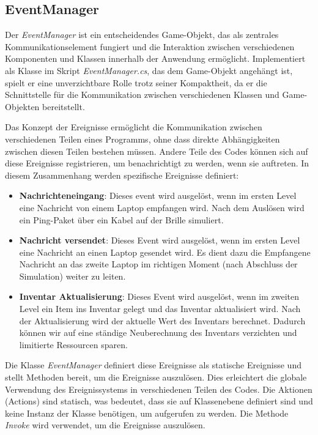 \subsection{EventManager} 

Der \textit{EventManager} ist ein entscheidendes Game-Objekt, das als zentrales Kommunikationselement fungiert und die
Interaktion zwischen verschiedenen Komponenten und Klassen innerhalb der Anwendung ermöglicht. Implementiert als Klasse
im Skript \textit{EventManager.cs}, das dem Game-Objekt angehängt ist, spielt er eine unverzichtbare Rolle trotz seiner
Kompaktheit, da er die Schnittstelle für die Kommunikation zwischen verschiedenen Klassen und Game-Objekten bereitstellt.

Das Konzept der Ereignisse ermöglicht die Kommunikation zwischen verschiedenen Teilen eines Programms, ohne dass direkte
Abhängigkeiten zwischen diesen Teilen bestehen müssen. Andere Teile des Codes können sich auf diese Ereignisse registrieren,
um benachrichtigt zu werden, wenn sie auftreten. In diesem Zusammenhang werden spezifische Ereignisse definiert:

\begin{itemize}
\item \textbf{Nachrichteneingang}: Dieses event wird ausgelöst, wenn im ersten Level eine Nachricht von einem Laptop
empfangen wird. Nach dem Auslösen wird ein Ping-Paket über ein Kabel auf der Brille simuliert.
\item \textbf{Nachricht versendet}: Dieses Event wird ausgelöst, wenn im ersten Level eine Nachricht an einen Laptop
gesendet wird. Es dient dazu die Empfangene Nachricht an das zweite Laptop im richtigen Moment (nach Abschluss der
Simulation) weiter zu leiten.
\item \textbf{Inventar Aktualisierung}: Dieses Event wird ausgelöst, wenn im zweiten Level ein Item ins Inventar gelegt und
das Inventar aktualisiert wird. Nach der Aktualisierung wird der aktuelle Wert des Inventars berechnet. Dadurch können
wir auf eine ständige Neuberechnung des Inventars verzichten und limitierte Ressourcen sparen.
\end{itemize}

Die Klasse \textit{EventManager} definiert diese Ereignisse als statische Ereignisse und stellt Methoden bereit, um die
Ereignisse auszulösen. Dies erleichtert die globale Verwendung des Ereignissystems in verschiedenen Teilen des Codes.
Die Aktionen (Actions) sind statisch, was bedeutet, dass sie auf Klassenebene definiert sind und keine Instanz der Klasse
benötigen, um aufgerufen zu werden. Die Methode \textit{Invoke} wird verwendet, um die Ereignisse auszulösen.


